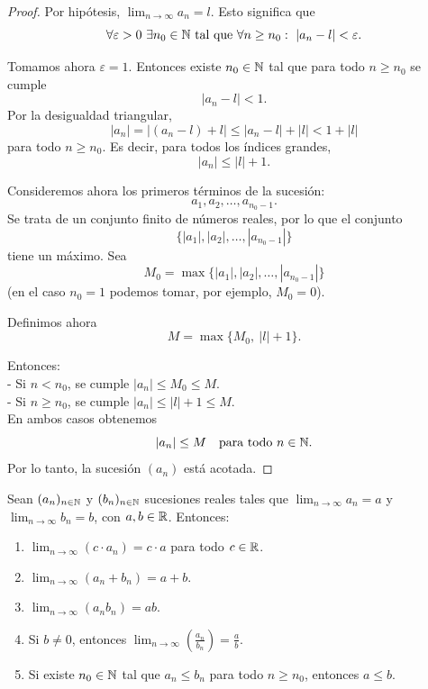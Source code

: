 \begin{proof}
Por hipótesis, $\lim_{n\to\infty} a_n = l$. Esto significa que
\[
\forall \varepsilon > 0 \ \exists n_0 \in \mathbb{N} \ \text{tal que} \ \forall n \ge n_0:
\ |a_n - l| < \varepsilon.
\]

Tomamos ahora $\varepsilon = 1$. Entonces existe $n_0 \in \mathbb{N}$ tal que para todo
$n \ge n_0$ se cumple
\[
|a_n - l| < 1.
\]
Por la desigualdad triangular,
\[
|a_n| = |(a_n - l) + l| \le |a_n - l| + |l| < 1 + |l|
\]
para todo $n \ge n_0$. Es decir, para todos los índices grandes,
\[
|a_n| \le |l| + 1.
\]

Consideremos ahora los primeros términos de la sucesión:
\[
a_1, a_2, \dots, a_{n_0-1}.
\]
Se trata de un conjunto finito de números reales, por lo que el conjunto
\[
\{|a_1|, |a_2|, \dots, |a_{n_0-1}|\}
\]
tiene un máximo. Sea
\[
M_0 = \max\{|a_1|, |a_2|, \dots, |a_{n_0-1}|\}
\]
(en el caso $n_0 = 1$ podemos tomar, por ejemplo, $M_0 = 0$).

Definimos ahora
\[
M = \max\{M_0,\ |l| + 1\}.
\]

Entonces:
\\- Si $n < n_0$, se cumple $|a_n| \le M_0 \le M$.
\\- Si $n \ge n_0$, se cumple $|a_n| \le |l| + 1 \le M$.
\\
En ambos casos obtenemos
\[
|a_n| \le M \quad \text{para todo } n \in \mathbb{N}.
\]
Por lo tanto, la sucesión $(a_n)$ está acotada.
\end{proof}

\begin{prop}
Sean $(a_n)_{n\in\mathbb{N}}$ y $(b_n)_{n\in\mathbb{N}}$ sucesiones reales tales que
$\lim_{n\to\infty} a_n = a$ y $\lim_{n\to\infty} b_n = b$, con $a, b \in \mathbb{R}$.
Entonces:
\begin{enumerate}[label=(\roman*)]
\item $\displaystyle\lim_{n\to\infty} (c \cdot a_n) = c \cdot a$ para todo $c \in \mathbb{R}$.
\item $\displaystyle\lim_{n\to\infty} (a_n + b_n) = a + b$.
\item $\displaystyle\lim_{n\to\infty} (a_n b_n) = ab$.
\item Si $b \neq 0$, entonces $\displaystyle\lim_{n\to\infty} \left(\frac{a_n}{b_n}\right) = \frac{a}{b}$.
\item Si existe $n_0 \in \mathbb{N}$ tal que $a_n \le b_n$ para todo $n \ge n_0$, entonces $a \le b$.
\end{enumerate}
\end{prop}


